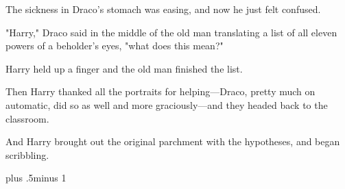 The sickness in Draco's stomach was easing, and now he just felt confused.

"Harry," Draco said in the middle of the old man translating a list of all
eleven powers of a beholder's eyes, "what does this mean?"

Harry held up a finger and the old man finished the list.

Then Harry thanked all the portraits for helping---Draco, pretty much on
automatic, did so as well and more graciously---and they headed back to the
classroom.

And Harry brought out the original parchment with the hypotheses, and began
scribbling.

\baselineskip plus .5\textheight minus 1\baselineskip

\savetrivseps
\setlength{\topsep}{0pt}
\setlength{\partopsep}{0pt}

